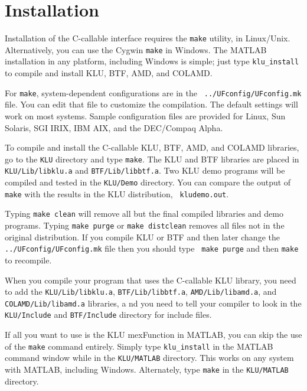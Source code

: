 \documentclass[11pt]{article}
\begin{document}
\section{Installation}
\label{Install}

Installation of the C-callable interface requires the {\tt make} utility, in
Linux/Unix.  Alternatively, you can use the Cygwin {\tt make} in Windows.
The MATLAB installation in any platform, including Windows is simple; just
type {\tt klu\_install} to compile and install KLU, BTF, AMD, and COLAMD.

For {\tt make}, system-dependent configurations are in the {\tt
../UFconfig/UFconfig.mk} file.  You can edit that file to customize the
compilation.  The default settings will work on most systems.  Sample
configuration files are provided for Linux, Sun Solaris, SGI IRIX, IBM AIX, and
the DEC/Compaq Alpha.

To compile and install the C-callable KLU, BTF, AMD, and COLAMD libraries, go
to the {\tt KLU} directory and type {\tt make}.  The KLU and BTF libraries are
placed in {\tt KLU/Lib/libklu.a} and {\tt BTF/Lib/libbtf.a}.  Two KLU demo
programs will be compiled and tested in the {\tt KLU/Demo} directory.  You can
compare the output of {\tt make} with the results in the KLU distribution, {\tt
kludemo.out}.

Typing {\tt make clean} will remove all but the final compiled libraries and
demo programs.  Typing {\tt make purge} or {\tt make distclean} removes all
files not in the original distribution.  If you compile KLU or BTF and then
later change the {\tt ../UFconfig/UFconfig.mk} file then you should type {\tt
make purge} and then {\tt make} to recompile.

When you compile your program that uses the C-callable KLU library, you need to
add the {\tt KLU/Lib/libklu.a}, {\tt BTF/Lib/libbtf.a}, {\tt AMD/Lib/libamd.a},
and {\tt COLAMD/Lib/libamd.a} libraries, a nd you need to tell your compiler to
look in the {\tt KLU/Include} and {\tt BTF/Include} directory for include
files.

If all you want to use is the KLU mexFunction in MATLAB, you can skip the use
of the {\tt make} command entirely.  Simply type {\tt klu\_install} in the
MATLAB command window while in the {\tt KLU/MATLAB} directory.  This works on
any system with MATLAB, including Windows.  Alternately, type {\tt make} in the
{\tt KLU/MATLAB} directory.
\end{document}
